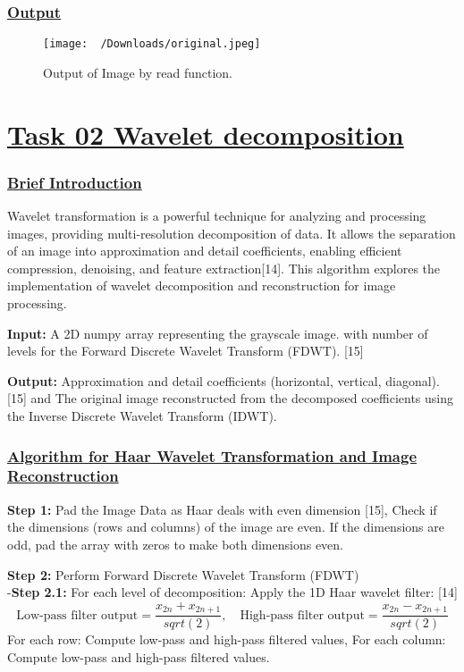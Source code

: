 \documentclass[
  11pt,
]{article}
\begin{document}
\subsubsection*{\underline{Output}}
\begin{figure}[H]
\centering
\texttt{[image: ~/Downloads/original.jpeg]}
\caption{Output of Image by read function.}
\label{fig:flowchart}
\end{figure}

\section*{\underline{Task 02 \textendash{} Wavelet decomposition}}

\subsubsection*{\underline{Brief Introduction}}

Wavelet transformation is a powerful technique for analyzing and
processing images, providing multi-resolution decomposition of data. It
allows the separation of an image into approximation and detail
coefficients, enabling efficient compression, denoising, and feature
extraction{[}14{]}. This algorithm explores the implementation of
wavelet decomposition and reconstruction for image processing.

\textbf{Input:} A 2D numpy array representing the grayscale image. with
number of levels for the Forward Discrete Wavelet Transform (FDWT).
{[}15{]}

\textbf{Output:} Approximation and detail coefficients (horizontal,
vertical, diagonal).{[}15{]} and The original image reconstructed from
the decomposed coefficients using the Inverse Discrete Wavelet Transform
(IDWT).

\subsubsection*{\underline{Algorithm for Haar Wavelet Transformation and Image Reconstruction}}

\textbf{Step 1:} Pad the Image Data as Haar deals with even dimension
{[}15{]}, Check if the dimensions (rows and columns) of the image are
even. If the dimensions are odd, pad the array with zeros to make both
dimensions even.

\textbf{Step 2:} Perform Forward Discrete Wavelet Transform (FDWT)\\
-\textbf{Step 2.1:} For each level of decomposition: Apply the 1D Haar
wavelet filter: {[}14{]} \[
          \text{Low-pass filter output} = \frac{x_{2n} + x_{2n+1}}{sqrt(2)}, \quad            \text{High-pass filter output} = \frac{x_{2n} - x_{2n+1}}{sqrt(2)}
        \] For each row: Compute low-pass and high-pass filtered values,
For each column: Compute low-pass and high-pass filtered values.
\end{document}
